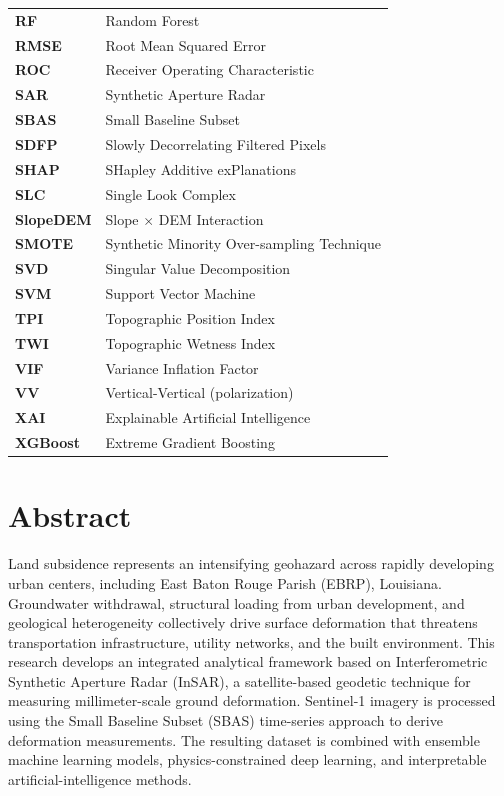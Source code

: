 \documentclass[oneside,doublespacing,flushright]{lsuthesis}
\begin{document}
\newpage
\noindent
\begin{tabular}{@{}l@{\hspace{4em}}l@{}}
\textbf{RF} & Random Forest \\
\textbf{RMSE} & Root Mean Squared Error \\
\textbf{ROC} & Receiver Operating Characteristic \\
\textbf{SAR} & Synthetic Aperture Radar \\
\textbf{SBAS} & Small Baseline Subset \\
\textbf{SDFP} & Slowly Decorrelating Filtered Pixels \\
\textbf{SHAP} & SHapley Additive exPlanations \\
\textbf{SLC} & Single Look Complex \\
\textbf{SlopeDEM} & Slope $\times$ DEM Interaction \\
\textbf{SMOTE} & Synthetic Minority Over-sampling Technique \\
\textbf{SVD} & Singular Value Decomposition \\
\textbf{SVM} & Support Vector Machine \\
\textbf{TPI} & Topographic Position Index \\
\textbf{TWI} & Topographic Wetness Index \\
\textbf{VIF} & Variance Inflation Factor \\
\textbf{VV} & Vertical-Vertical (polarization) \\
\textbf{XAI} & Explainable Artificial Intelligence \\
\textbf{XGBoost} & Extreme Gradient Boosting \\
\end{tabular}


\chapter{Abstract}

Land subsidence represents an intensifying geohazard across rapidly developing urban centers, including East Baton Rouge Parish (EBRP), Louisiana. Groundwater withdrawal, 
structural loading from urban development, and geological heterogeneity collectively drive surface deformation that threatens transportation infrastructure, utility networks, 
and the built environment. This research develops an integrated analytical framework based on Interferometric Synthetic Aperture Radar (InSAR), a satellite-based geodetic technique for 
measuring millimeter-scale ground deformation. Sentinel-1 imagery is processed using the Small Baseline Subset (SBAS) time-series approach to derive deformation measurements. 
The resulting dataset is combined with ensemble machine learning models, physics-constrained deep learning, and interpretable artificial-intelligence methods.
\end{document}
